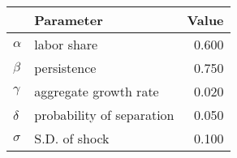 \begin{tabular}{llr} 
\toprule 
  	 & 	 \textbf{Parameter} 	 & 	 \textbf{Value} \\ 
\midrule 
$\alpha$ 	 & 	 labor share 	 & 	 0.600 \\ 
$\beta$ 	 & 	 persistence 	 & 	 0.750 \\ 
$\gamma$ 	 & 	 aggregate growth rate 	 & 	 0.020 \\ 
$\delta$ 	 & 	 probability of separation 	 & 	 0.050 \\ 
$\sigma$ 	 & 	 S.D. of shock 	 & 	 0.100 \\ 
\bottomrule 
\end{tabular}